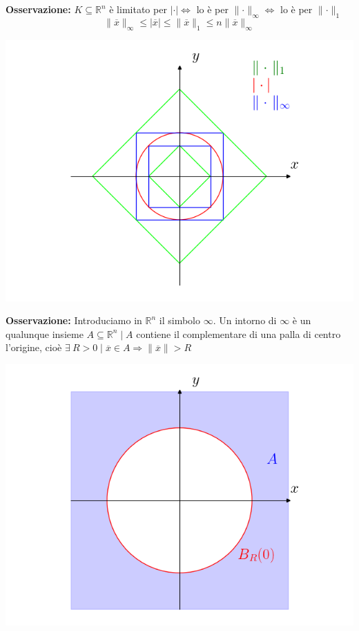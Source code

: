 \textbf{Osservazione:}
$K \subseteq \mathbb{R}^n$ è limitato per $|\cdot| \iff$ lo è per $\parallel \cdot \parallel_\infty \iff$ lo è per $\parallel \cdot \parallel_1$
\begin{equation*}
	\parallel \overline{x} \parallel_\infty \leq |\overline{x}| \leq \parallel \overline{x} \parallel_1 \leq n \parallel \overline{x} \parallel_\infty
\end{equation*}


\begin{center}
	\label{fig:pag166_1}
	\includegraphics[width=0.7\linewidth]{spazi_metrici_e_normati/pag166_1}
\end{center}


\textbf{Osservazione:}
Introduciamo in $\mathbb{R}^n$ il simbolo $\infty$. Un intorno di $\infty$ è un qualunque insieme $A \subseteq \mathbb{R}^n \; \big| \; A$ contiene il complementare di una palla di centro l'origine, cioè $\exists \ R > 0 \; \big| \; \overline{x} \in A \Rightarrow \parallel \overline{x} \parallel > R$
\begin{center}
	\includegraphics[width=0.7\linewidth]{spazi_metrici_e_normati/pag166_2}
	\label{fig:pag1662}
\end{center}

